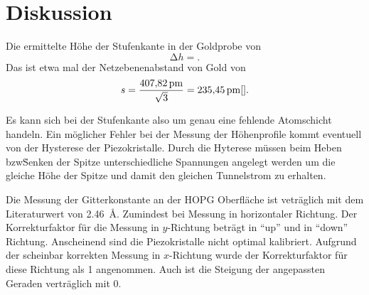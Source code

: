 \section{Diskussion}\label{sec:Diskussion}

Die ermittelte Höhe der Stufenkante in der Goldprobe von
\begin{equation*}
  \increment h = .
\end{equation*}
 Das ist etwa  mal der Netzebenenabstand von Gold von
 \begin{equation*}
   s = \frac{\SI{407.82}{\pico\meter}}{\sqrt{3}} = \SI{235.45}{\pico\meter} \cite{}.   
 \end{equation*}


Es kann sich bei der Stufenkante also um genau eine fehlende Atomschicht handeln. Ein möglicher Fehler bei der Messung der Höhenprofile
kommt eventuell von der Hysterese der Piezokristalle. Durch die Hyterese müssen beim Heben bzw\. Senken der Spitze unterschiedliche Spannungen angelegt werden
um die gleiche Höhe der Spitze und damit den gleichen Tunnelstrom zu erhalten.


Die Messung der Gitterkonstante an der HOPG Oberfläche ist veträglich mit dem Literaturwert von \SI{2.46}{\angstrom}. Zumindest bei Messung in horizontaler Richtung.
Der Korrekturfaktor für die Messung in $y$-Richtung beträgt  in \enquote{up} und  in
\enquote{down} Richtung. Anscheinend sind die Piezokristalle nicht optimal kalibriert.
Aufgrund der scheinbar korrekten Messung in $x$-Richtung wurde der Korrekturfaktor für diese Richtung als \num{1} angenommen. Auch ist die Steigung der angepassten Geraden verträglich mit \num{0}.
